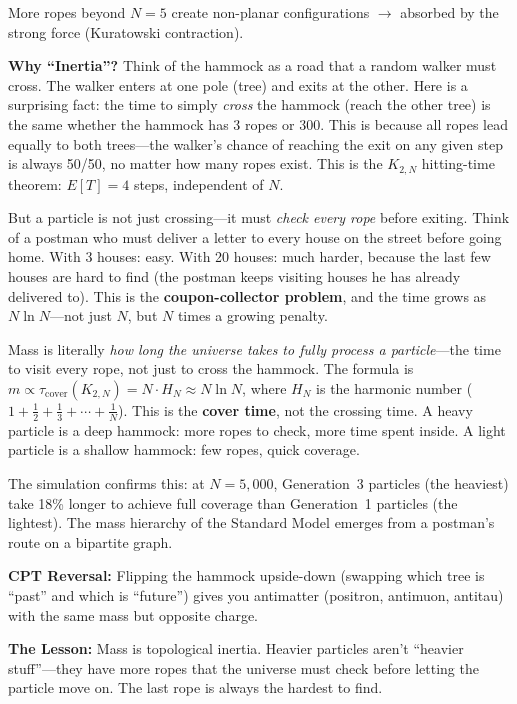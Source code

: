 \documentclass[11pt, a4paper, openany]{book}
\begin{document}
\begin{thoughtexp}
More ropes beyond $N = 5$ create non-planar configurations $\to$ absorbed by the strong force (Kuratowski contraction).

\textbf{Why ``Inertia''?} Think of the hammock as a road that a random walker must cross. The walker enters at one pole (tree) and exits at the other. Here is a surprising fact: the time to simply \emph{cross} the hammock (reach the other tree) is the same whether the hammock has 3 ropes or 300. This is because all ropes lead equally to both trees---the walker's chance of reaching the exit on any given step is always 50/50, no matter how many ropes exist. This is the $K_{2,N}$ hitting-time theorem: $E[T] = 4$ steps, independent of $N$.

But a particle is not just crossing---it must \emph{check every rope} before exiting. Think of a postman who must deliver a letter to every house on the street before going home. With 3 houses: easy. With 20 houses: much harder, because the last few houses are hard to find (the postman keeps visiting houses he has already delivered to). This is the \textbf{coupon-collector problem}, and the time grows as $N \ln N$---not just $N$, but $N$ times a growing penalty.

Mass is literally \emph{how long the universe takes to fully process a particle}---the time to visit every rope, not just to cross the hammock. The formula is $m \propto \tau_{\text{cover}}(K_{2,N}) = N \cdot H_N \approx N \ln N$, where $H_N$ is the harmonic number ($1 + \tfrac{1}{2} + \tfrac{1}{3} + \cdots + \tfrac{1}{N}$). This is the \textbf{cover time}, not the crossing time. A heavy particle is a deep hammock: more ropes to check, more time spent inside. A light particle is a shallow hammock: few ropes, quick coverage.

The simulation confirms this: at $N = 5{,}000$, Generation~3 particles (the heaviest) take 18\% longer to achieve full coverage than Generation~1 particles (the lightest). The mass hierarchy of the Standard Model emerges from a postman's route on a bipartite graph.

\textbf{CPT Reversal:} Flipping the hammock upside-down (swapping which tree is ``past'' and which is ``future'') gives you antimatter (positron, antimuon, antitau) with the same mass but opposite charge.

\textbf{The Lesson:} Mass is topological inertia. Heavier particles aren't ``heavier stuff''---they have more ropes that the universe must check before letting the particle move on. The last rope is always the hardest to find.


\end{thoughtexp}
\end{document}
